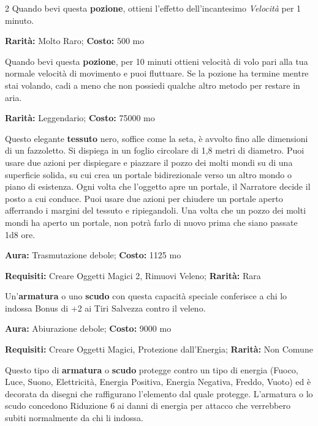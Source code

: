 \begin{multicols}{2}
Quando bevi questa \textbf{pozione}, ottieni l'effetto dell'incantesimo \emph{Velocità} per 1 minuto.


\textbf{Rarità:} Molto Raro; \textbf{Costo:} 500 mo

Quando bevi questa \textbf{pozione}, per 10 minuti ottieni velocità di volo pari alla tua normale velocità di movimento e puoi fluttuare. Se la pozione ha termine mentre stai volando, cadi a meno che non possiedi qualche altro metodo per restare in aria.


\textbf{Rarità:} Leggendario; \textbf{Costo:} 75000 mo

Questo elegante \textbf{tessuto} nero, soffice come la seta, è avvolto fino alle dimensioni di un fazzoletto. Si dispiega in un foglio circolare di 1,8 metri di diametro. Puoi usare due azioni per dispiegare e piazzare il pozzo dei molti mondi su di una superficie solida, su cui crea un portale bidirezionale verso un altro mondo o piano di esistenza. Ogni volta che l'oggetto apre un portale, il Narratore decide il posto a cui conduce. Puoi usare due azioni per chiudere un portale aperto afferrando i margini del tessuto e ripiegandoli. Una volta che un pozzo dei molti mondi ha aperto un portale, non potrà farlo di nuovo prima che siano passate 1d8 ore.


\textbf{Aura:} Trasmutazione debole; \textbf{Costo:} 1125 mo

\textbf{Requisiti:} Creare Oggetti Magici 2, Rimuovi Veleno; \textbf{Rarità:} Rara

Un'\textbf{armatura} o uno \textbf{scudo} con questa capacità speciale conferisce a chi lo indossa Bonus di +2 ai Tiri Salvezza contro il veleno.


\textbf{Aura:} Abiurazione debole; \textbf{Costo:} 9000 mo

\textbf{Requisiti:} Creare Oggetti Magici, Protezione dall'Energia; \textbf{Rarità:} Non Comune

Questo tipo di \textbf{armatura} o \textbf{scudo} protegge contro un tipo di energia (Fuoco, Luce, Suono, Elettricità, Energia Positiva, Energia Negativa, Freddo, Vuoto) ed è decorata da disegni che raffigurano l'elemento dal quale protegge. L'armatura o lo scudo concedono Riduzione 6 ai danni di energia per attacco che verrebbero subiti normalmente da chi li indossa.


\end{multicols}
